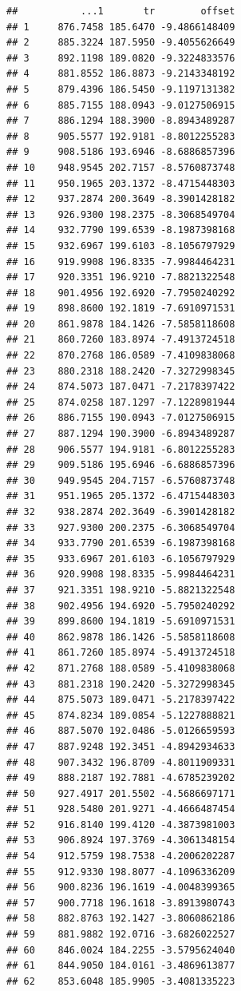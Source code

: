 \documentclass[
]{article}
\begin{document}
\begin{verbatim}
##           ...1       tr        offset
## 1     876.7458 185.6470 -9.4866148409
## 2     885.3224 187.5950 -9.4055626649
## 3     892.1198 189.0820 -9.3224833576
## 4     881.8552 186.8873 -9.2143348192
## 5     879.4396 186.5450 -9.1197131382
## 6     885.7155 188.0943 -9.0127506915
## 7     886.1294 188.3900 -8.8943489287
## 8     905.5577 192.9181 -8.8012255283
## 9     908.5186 193.6946 -8.6886857396
## 10    948.9545 202.7157 -8.5760873748
## 11    950.1965 203.1372 -8.4715448303
## 12    937.2874 200.3649 -8.3901428182
## 13    926.9300 198.2375 -8.3068549704
## 14    932.7790 199.6539 -8.1987398168
## 15    932.6967 199.6103 -8.1056797929
## 16    919.9908 196.8335 -7.9984464231
## 17    920.3351 196.9210 -7.8821322548
## 18    901.4956 192.6920 -7.7950240292
## 19    898.8600 192.1819 -7.6910971531
## 20    861.9878 184.1426 -7.5858118608
## 21    860.7260 183.8974 -7.4913724518
## 22    870.2768 186.0589 -7.4109838068
## 23    880.2318 188.2420 -7.3272998345
## 24    874.5073 187.0471 -7.2178397422
## 25    874.0258 187.1297 -7.1228981944
## 26    886.7155 190.0943 -7.0127506915
## 27    887.1294 190.3900 -6.8943489287
## 28    906.5577 194.9181 -6.8012255283
## 29    909.5186 195.6946 -6.6886857396
## 30    949.9545 204.7157 -6.5760873748
## 31    951.1965 205.1372 -6.4715448303
## 32    938.2874 202.3649 -6.3901428182
## 33    927.9300 200.2375 -6.3068549704
## 34    933.7790 201.6539 -6.1987398168
## 35    933.6967 201.6103 -6.1056797929
## 36    920.9908 198.8335 -5.9984464231
## 37    921.3351 198.9210 -5.8821322548
## 38    902.4956 194.6920 -5.7950240292
## 39    899.8600 194.1819 -5.6910971531
## 40    862.9878 186.1426 -5.5858118608
## 41    861.7260 185.8974 -5.4913724518
## 42    871.2768 188.0589 -5.4109838068
## 43    881.2318 190.2420 -5.3272998345
## 44    875.5073 189.0471 -5.2178397422
## 45    874.8234 189.0854 -5.1227888821
## 46    887.5070 192.0486 -5.0126659593
## 47    887.9248 192.3451 -4.8942934633
## 48    907.3432 196.8709 -4.8011909331
## 49    888.2187 192.7881 -4.6785239202
## 50    927.4917 201.5502 -4.5686697171
## 51    928.5480 201.9271 -4.4666487454
## 52    916.8140 199.4120 -4.3873981003
## 53    906.8924 197.3769 -4.3061348154
## 54    912.5759 198.7538 -4.2006202287
## 55    912.9330 198.8077 -4.1096336209
## 56    900.8236 196.1619 -4.0048399365
## 57    900.7718 196.1618 -3.8913980743
## 58    882.8763 192.1427 -3.8060862186
## 59    881.9882 192.0716 -3.6826022527
## 60    846.0024 184.2255 -3.5795624040
## 61    844.9050 184.0161 -3.4869613877
## 62    853.6048 185.9905 -3.4081335223

\end{verbatim}
\end{document}
